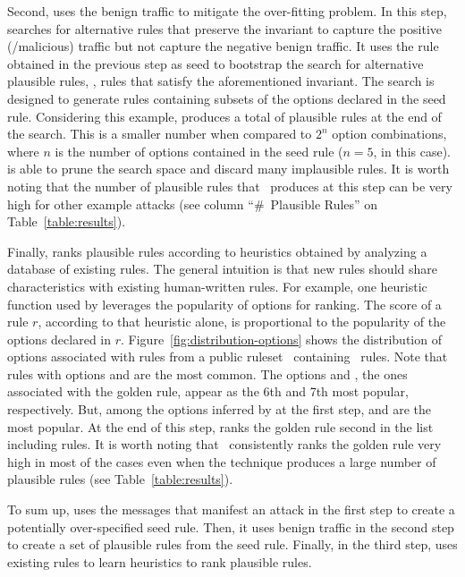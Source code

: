 \documentclass[sigconf,review, anonymous]{acmart}
\begin{document}
Second, \tname{} uses the benign traffic to mitigate the over-fitting
problem. In this step, \tname{} searches for alternative rules that
preserve the invariant to capture the positive (/malicious) traffic
but not capture the negative benign traffic. It uses the rule obtained
in the previous step as seed to bootstrap the search for alternative
plausible rules, \ie{}, rules that satisfy the aforementioned
invariant. The search is designed to generate rules containing subsets
of the options declared in the seed rule. Considering this example,
\tname{} produces a total of \pingscanplausible{} plausible rules at
the end of the search. This is a smaller number when compared to $2^n$
option combinations, where $n$ is the number of options contained in
the seed rule ($n=5$, in this case). \tname{} is able to prune the
search space and discard many implausible rules. It is worth noting
that the number of plausible rules that \tname\ produces at this step
can be very high for other example attacks (see column ``\#~Plausible
Rules'' on Table~\ref{table:results}).

Finally, \tname{} ranks plausible rules according to heuristics
obtained by analyzing a database of existing rules. The general
intuition is that new rules should share characteristics with existing
human-written rules. For example, one heuristic function used by
\tname{} leverages the popularity of options for ranking.  The score
of a rule $r$, according to that heuristic alone, is proportional to
the popularity of the options declared in
$r$. Figure~\ref{fig:distribution-options} shows the distribution of
options associated with rules from a public
ruleset~\cite{emerging-threats-open} containing
\numrulessuri\ rules. Note that rules with options 
and  are the most common. The options  and
, the ones associated with the golden rule, appear as
the 6th and 7th most popular, respectively. But, among the options
inferred by \tname{} at the first step,  and
 are the most popular. At the end of this step, \tname{}
ranks the golden rule second in the list including
\pingscanplausible{} rules. It is worth noting that
\tname\ consistently ranks the golden rule very high in most of the
cases even when the technique produces a large number of plausible
rules (see Table~\ref{table:results}).

To sum up, \tname{} uses the messages that manifest an attack in the
first step to create a potentially over-specified seed rule. Then, it
uses benign traffic in the second step to create a set of plausible
rules from the seed rule. Finally, in the third step, \tname{} uses
existing rules to learn heuristics to rank plausible rules.
\end{document}
